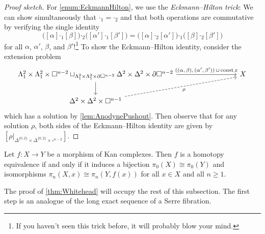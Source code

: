 \begin{proof}[Proof sketch]
	For \cref{enum:EckmannHilton}, we use the \emph{Eckmann--Hilton trick}: We can show simultaneously that $\boldsymbol{\cdot}_1=\boldsymbol{\cdot}_2$ and that both operations are commutative by verifying the single identity
	\begin{equation*}
		\bigl([\alpha]\mathbin{\boldsymbol{\cdot}_1}[\beta]\bigr)\mathbin{\boldsymbol{\cdot}_2}\bigl([\alpha']\mathbin{\boldsymbol{\cdot}_1}[\beta']\bigr)=\bigl([\alpha]\mathbin{\boldsymbol{\cdot}_2}[\alpha']\bigr)\mathbin{\boldsymbol{\cdot}_1}\bigl([\beta]\mathbin{\boldsymbol{\cdot}_2}[\beta']\bigr)
	\end{equation*}
	for all $\alpha$, $\alpha'$, $\beta$, and $\beta'$!\footnote{If you haven't seen this trick before, it will probably blow your mind.} To show the Eckmann--Hilton identity, consider the extension problem
	\begin{equation*}
		\begin{tikzcd}[column sep=8.5em]
			\Lambda_1^2\times\Lambda_1^2\times\square^{n-2}\sqcup_{\Lambda_1^2\times\Lambda_1^2\times\partial\square^{n-2}}\Delta^2\times\Delta^2\times\partial\square^{n-2}\dar\rar["{((\alpha,\,\beta),\,(\alpha',\,\beta'))}\,\cup\,{\const x}"] & X\\
			\Delta^2\times\Delta^2\times\square^{n-1}\urar[dashed,"\rho"',end anchor=202]
		\end{tikzcd}
	\end{equation*}
	which has a solution by \cref{lem:AnodynePushout}. Then observe that for any solution $\rho$, both sides of the Eckmann--Hilton identity are given by $[\rho|_{\Delta^{\{0,2\}}\times \Delta^{\{0,2\}}\times\square^{n-2}}]$.
\end{proof}
\begin{thm}\label{thm:Whitehead}
	Let $f\colon X\rightarrow Y$ be a morphism of Kan complexes. Then $f$ is a homotopy equivalence if and only if it induces a bijection $\pi_0(X)\cong \pi_0(Y)$ and isomorphisms $\pi_n(X,x)\cong \pi_n(Y,f(x))$ for all $x\in X$ and all $n\geqslant 1$.
\end{thm}
The proof of \cref{thm:Whitehead} will occupy the rest of this subsection. The first step is an analogue of the long exact sequence of a Serre fibration.
